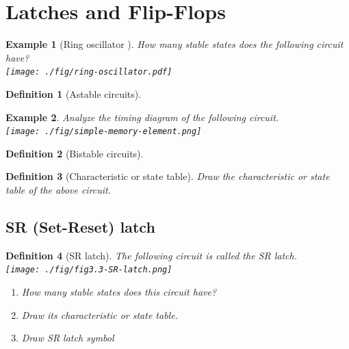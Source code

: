 \documentclass{article}
\newtheorem{example}{Example}
\newtheorem{definition}{Definition}
\begin{document}
\section{Latches and Flip-Flops \cite[Sec~3.2]{harris2022digital}}

\begin{example}[Ring oscillator ] \cite[Sec~3.31]{harris2022digital}
  How many stable states does the following circuit have?\\
  \texttt{[image: ./fig/ring-oscillator.pdf]} 
\end{example}
\vspace{10em}

\begin{definition}[Astable circuits]
\end{definition}
\vspace{5em}


\begin{example}
  Analyze the timing diagram of the following circuit.\\
  \texttt{[image: ./fig/simple-memory-element.png]}
\end{example}
\vspace{10em}

\begin{definition}[Bistable circuits]
\end{definition}
\vspace{5em}

\begin{definition}[Characteristic or state table]
  Draw the characteristic or state table of the above circuit. 
\end{definition}
\vspace{10em}



\subsection{SR (Set-Reset) latch \cite[Sec~3.2.1]{harris2022digital}}

\begin{definition}[SR latch]
  The following circuit is called the SR latch. \\
  \texttt{[image: ./fig/fig3.3-SR-latch.png]} \\
  \begin{enumerate}
    \item How many stable states does this circuit have?
    \item Draw its characteristic or state table.
    \item Draw SR latch symbol
  \end{enumerate}
\end{definition}
\vspace{20em}
\end{document}
